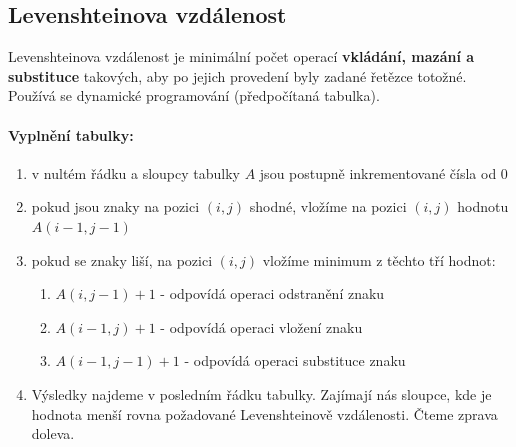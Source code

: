 \subsection{Levenshteinova vzdálenost}
Levenshteinova vzdálenost je minimální počet operací \textbf{vkládání, mazání a substituce} takových, aby po jejich provedení byly zadané řetězce totožné. Používá se dynamické programování (předpočítaná tabulka).

\paragraph{Vyplnění tabulky:}

\begin{enumerate}
\item v nultém řádku a sloupcy tabulky $A$ jsou postupně inkrementované čísla od 0
\item pokud jsou znaky na pozici $(i,j)$ shodné, vložíme na pozici $(i,j)$ hodnotu $A(i-1, j-1)$
\item pokud se znaky liší, na pozici $(i,j)$ vložíme minimum z těchto tří hodnot:
\begin{enumerate}
\item $A(i,j-1)+1$ - odpovídá operaci odstranění znaku
\item $A(i-1,j)+1$ - odpovídá operaci vložení znaku
\item $A(i-1,j-1)+1$ - odpovídá operaci substituce znaku
\end{enumerate}
\item Výsledky najdeme v posledním řádku tabulky. Zajímají nás sloupce, kde je hodnota menší rovna požadované Levenshteinově vzdálenosti. Čteme zprava doleva.
\end{enumerate}


